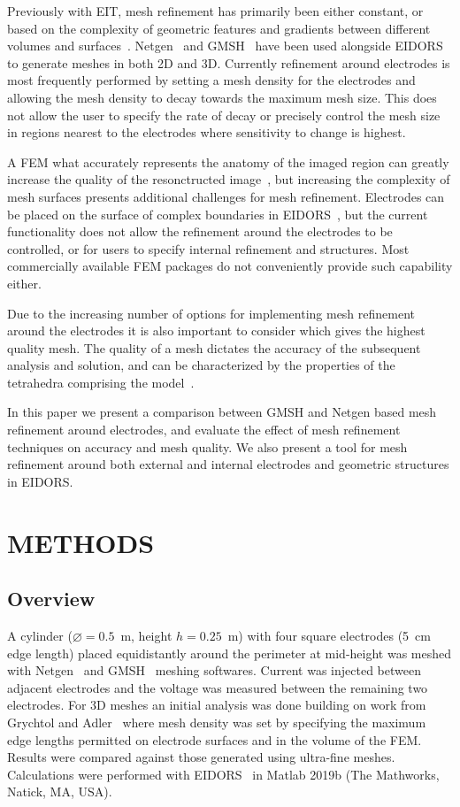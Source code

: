 \documentclass[12pt]{iopart}
\begin{document}
Previously with EIT, mesh refinement has primarily been either 
constant, or based on 
the complexity of geometric features
and gradients between different volumes and surfaces~\parencite{Grychtol2009}.  
Netgen~\parencite{Schoberl1997} and GMSH~\parencite{Geuzaine2009} have been used alongside 
EIDORS~\parencite{Adler2009} to generate meshes in both 2D and 3D. 
Currently refinement around electrodes is most frequently performed by 
setting a mesh density for the electrodes and allowing the mesh density to 
decay towards the maximum mesh size. This does not allow the user to specify 
the rate of decay or precisely control the mesh size in regions nearest to 
the  electrodes where sensitivity to change is highest.

A FEM what accurately represents the anatomy of the imaged region 
can greatly increase the quality of the resonctructed image~\parencite{Zhang2017},
but increasing the complexity of mesh surfaces presents additional challenges for
mesh refinement. Electrodes can be placed on the surface of complex boundaries in 
EIDORS~\parencite{Grychtol2013}, but the current functionality does not allow the
refinement around the electrodes to be controlled, or for users to specify internal 
refinement and structures.
Most commercially available FEM packages
do not conveniently provide such capability either.

Due to the increasing number of options for implementing mesh refinement around the
electrodes it is also important to consider which gives the highest quality mesh. 
The quality of a mesh dictates the accuracy of the subsequent analysis 
and solution, and can be characterized by the properties of the tetrahedra
comprising the model~\parencite{Parthasarathy1993}.

In this paper we present a comparison between GMSH and 
Netgen based mesh refinement around electrodes, and evaluate the 
effect of mesh refinement techniques on accuracy and mesh quality. 
We also present a tool for mesh refinement around both external and internal
electrodes and geometric structures in EIDORS. 

\section{METHODS}
\subsection{Overview}
A cylinder ($\diameter=0.5$~m, height $h=0.25$~m) with four square electrodes 
(5~cm edge length) placed equidistantly around the perimeter at mid-height was
meshed with Netgen~\parencite{Schoberl1997} and GMSH~\parencite{Geuzaine2009}
meshing softwares.
Current was injected between adjacent electrodes and the voltage was measured between the remaining
two electrodes.
For 3D meshes an initial analysis was done building on work from 
Grychtol and Adler~\parencite{Grychtol2013} where mesh density was
set by specifying the maximum edge lengths permitted on electrode surfaces
and in the volume of the FEM.
Results were compared against those generated using ultra-fine meshes. 
Calculations were performed with EIDORS~\parencite{Adler2006} in Matlab 2019b
(The Mathworks, Natick, MA, USA).
\end{document}

